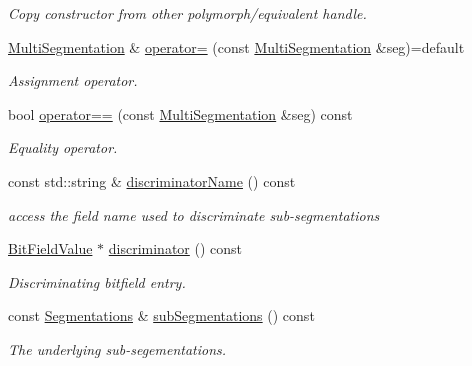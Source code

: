 \begin{DoxyCompactItemize}
\begin{DoxyCompactList}\small\item\em Copy constructor from other polymorph/equivalent handle. \end{DoxyCompactList}\item 
\hyperlink{class_d_d4hep_1_1_geometry_1_1_multi_segmentation}{Multi\+Segmentation} \& \hyperlink{class_d_d4hep_1_1_geometry_1_1_multi_segmentation_a86de05c12f7b53d8df03d72efa5e4252}{operator=} (const \hyperlink{class_d_d4hep_1_1_geometry_1_1_multi_segmentation}{Multi\+Segmentation} \&seg)=default
\begin{DoxyCompactList}\small\item\em Assignment operator. \end{DoxyCompactList}\item 
bool \hyperlink{class_d_d4hep_1_1_geometry_1_1_multi_segmentation_a316d28a62502365533defed5a686091e}{operator==} (const \hyperlink{class_d_d4hep_1_1_geometry_1_1_multi_segmentation}{Multi\+Segmentation} \&seg) const
\begin{DoxyCompactList}\small\item\em Equality operator. \end{DoxyCompactList}\item 
const std\+::string \& \hyperlink{class_d_d4hep_1_1_geometry_1_1_multi_segmentation_a3bbea5174912d47c0a94b9998b77579e}{discriminator\+Name} () const
\begin{DoxyCompactList}\small\item\em access the field name used to discriminate sub-\/segmentations \end{DoxyCompactList}\item 
\hyperlink{class_d_d4hep_1_1_d_d_segmentation_1_1_bit_field_value}{Bit\+Field\+Value} $\ast$ \hyperlink{class_d_d4hep_1_1_geometry_1_1_multi_segmentation_a8467d1730b8d5429b7fe4c8da6e04bd6}{discriminator} () const
\begin{DoxyCompactList}\small\item\em Discriminating bitfield entry. \end{DoxyCompactList}\item 
const \hyperlink{class_d_d4hep_1_1_geometry_1_1_multi_segmentation_ae2c7165290144f20af27248eab1858c5}{Segmentations} \& \hyperlink{class_d_d4hep_1_1_geometry_1_1_multi_segmentation_ad6c4a7d2d7405c4e910a14c01a42829d}{sub\+Segmentations} () const
\begin{DoxyCompactList}\small\item\em The underlying sub-\/segementations. \end{DoxyCompactList}\item 

\end{DoxyCompactItemize}
